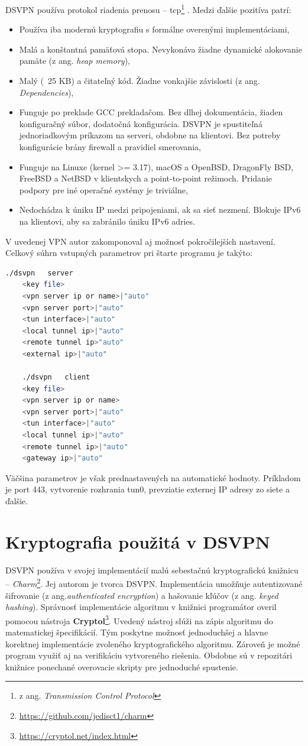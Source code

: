 DSVPN používa protokol riadenia prenosu -- \acrshort{tcp}\footnote{z ang. \textit{Transmission Control Protocol}} \cite{tcp}. Medzi ďalšie pozitíva patrí:
\begin{itemize}
	\item{Používa iba modernú kryptografiu s formálne overenými implementáciami,}
	\item{Malá a konštantná pamäťová stopa. Nevykonáva žiadne dynamické alokovanie pamäte (z ang. \textit{heap memory}),}
	\item{Malý (~25 KB) a čitateľný kód. Žiadne vonkajšie závislosti (z ang. \textit{Dependencies}),}
	\item{Funguje po preklade GCC prekladačom. Bez dlhej dokumentácia, žiaden konfiguračný súbor, dodatočná konfigurácia. DSVPN je spustiteľná jednoriadkovým príkazom na serveri, obdobne na klientovi. Bez potreby konfigurácie brány firewall a pravidiel smerovania,}
	\item{Funguje na Linuxe (kernel >= 3.17), macOS a OpenBSD, DragonFly BSD, FreeBSD a NetBSD v klientskych a point-to-point režimoch. Pridanie podpory pre iné operačné systémy je triviálne,}
	\item{Nedochádza k úniku IP medzi pripojeniami, ak sa sieť nezmení. Blokuje IPv6 na klientovi, aby sa zabránilo úniku IPv6 adries.}
\end{itemize} 

V uvedenej VPN autor zakomponoval aj možnosť pokročilejších nastavení. Celkový súhrn vstupných parametrov pri štarte programu je takýto:
\begin{lstlisting}[language=bash]
	./dsvpn   server
	<key file>
	<vpn server ip or name>|"auto"
	<vpn server port>|"auto"
	<tun interface>|"auto"
	<local tunnel ip>|"auto"
	<remote tunnel ip>"auto"
	<external ip>|"auto"

	./dsvpn   client
	<key file>
	<vpn server ip or name>
	<vpn server port>|"auto"
	<tun interface>|"auto"
	<local tunnel ip>|"auto"
	<remote tunnel ip>|"auto"
	<gateway ip>|"auto"
	\end{lstlisting} 
Väčšina parametrov je však prednastavených na automatické hodnoty. Príkladom je port 443, vytvorenie rozhrania tun0, prevziatie externej IP adresy zo siete a ďalšie. 

\section{Kryptografia použitá v DSVPN}
DSVPN používa v svojej implementácií malú sebestačnú kryptografickú knižnicu -- \textit{Charm}\footnote{\url{https://github.com/jedisct1/charm}}. Jej autorom je tvorca DSVPN. Implementácia umožňuje autentizované šifrovanie (z ang.\textit{authenticated encryption}) a hašovanie kľúčov (z ang. \textit{keyed hashing}). Správnosť implementácie algoritmu v knižnici programátor overil pomocou nástroja \textbf{Cryptol}\footnote{\url{https://cryptol.net/index.html}}. Uvedený nástroj slúži na zápis algoritmu do matematickej špecifikácií. Tým poskytne možnosť jednoduchšej a hlavne korektnej implementácie zvoleného kryptografického algoritmu. Zároveň je možné program využiť aj na verifikáciu vytvoreného riešenia. Obdobne sú v repozitári knižnice ponechané overovacie skripty pre jednoduché spustenie. 

